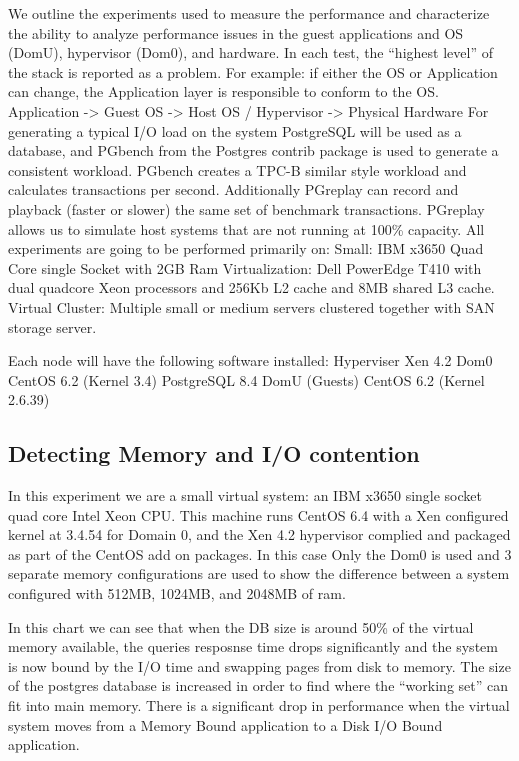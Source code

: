 We outline the experiments used to measure the performance and characterize the ability to analyze performance issues in the guest applications and OS (DomU), hypervisor (Dom0), and hardware.  In each test, the “highest level” of the stack is reported as a problem.  For example: if either the OS or Application can change, the Application layer is responsible to conform to the OS. 
\newline
Application ->  Guest OS -> Host OS / Hypervisor -> Physical Hardware
\newline
For generating a typical I/O load on the system PostgreSQL will be used as a database, and PGbench from the Postgres contrib package is used to generate a consistent workload.  PGbench creates a TPC-B similar style workload and calculates transactions per second.   Additionally PGreplay can record and playback (faster or slower) the same set of benchmark transactions.  PGreplay allows us to simulate host systems that are not running at 100\% capacity.  
\newline
All experiments are going to be performed primarily on:
Small:  IBM x3650 Quad Core single Socket with 2GB Ram
Virtualization:  Dell PowerEdge T410 with dual quadcore Xeon processors and 256Kb L2 cache and 8MB shared L3 cache.  
Virtual Cluster:   Multiple small or medium servers clustered together with SAN storage server.

Each node will have the following software installed:
Hyperviser 
Xen 4.2
Dom0 	                   
CentOS 6.2   (Kernel 3.4)
PostgreSQL 8.4
DomU (Guests)       
CentOS 6.2   (Kernel 2.6.39)


\subsection{Detecting Memory and I/O contention}
In this experiment we are a small virtual system: an IBM x3650 single socket quad core Intel Xeon CPU.   This machine runs CentOS 6.4 with a Xen configured kernel at 3.4.54 for Domain 0, and the Xen 4.2 hypervisor complied and packaged as part of the CentOS add on packages.   In this case Only the Dom0 is used and 3 separate memory configurations are used to show the difference between a system configured with 512MB, 1024MB, and 2048MB of ram.

\indent In this chart we can see that when the DB size is around 50\% of the virtual memory available, the queries resposnse time drops significantly and the system is now bound by the I/O time and swapping pages from disk to memory.   The size of the postgres database is increased in order to find where the “working set” can fit into main memory.    There is a significant drop in performance when the virtual system moves from a Memory Bound application to a Disk I/O Bound application.

